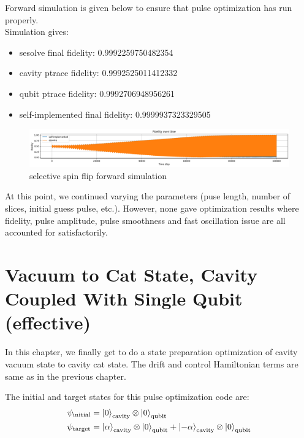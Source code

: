 \documentclass[12pt]{report}
\begin{document}
Forward simulation is given below to ensure that pulse optimization has run properly. 
\\
Simulation gives: 
\begin{itemize}
    \item sesolve final fidelity:  0.9992259750482354
    \item cavity ptrace fidelity:  0.9992525011412332
    \item qubit ptrace fidelity:  0.9992706948956261
    \item self-implemented final fidelity:  0.9999937323329505
\end{itemize}
\begin{figure}[H]
    \centering
    \includegraphics[width=0.95\linewidth]{selective_spin_flip_GRAPE_500,_100_000_LIN_constraints_simulation.png}
    \caption{selective spin flip forward simulation}
    \label{fig:selective_spin_flip_constraints_forward_simulation}
\end{figure}

At this point, we continued varying the parameters (puse length, number of slices, initial guess pulse, etc.). 
However, none gave optimization results where fidelity, pulse amplitude, pulse smoothness and fast oscillation issue 
are all accounted for satisfactorily. 

\section{Vacuum to Cat State, Cavity Coupled With Single Qubit (effective)}\label{sec:vac2cat}
In this chapter, we finally get to do a state preparation optimization of cavity vacuum state to cavity cat state.
The drift and control Hamiltonian terms are same as in the previous chapter.

The initial and target states for this pulse optimization code are:
\begin{align}
    \psi_{\text{initial}} &= \ket{0}_{\text{cavity}} \otimes \ket{0}_{\text{qubit}} \\
    \psi_{\text{target}} &= \ket{\alpha}_{\text{cavity}} \otimes \ket{0}_{\text{qubit}} 
                + \ket{-\alpha}_{\text{cavity}} \otimes \ket{0}_{\text{qubit}} \\
\end{align}
\end{document}

